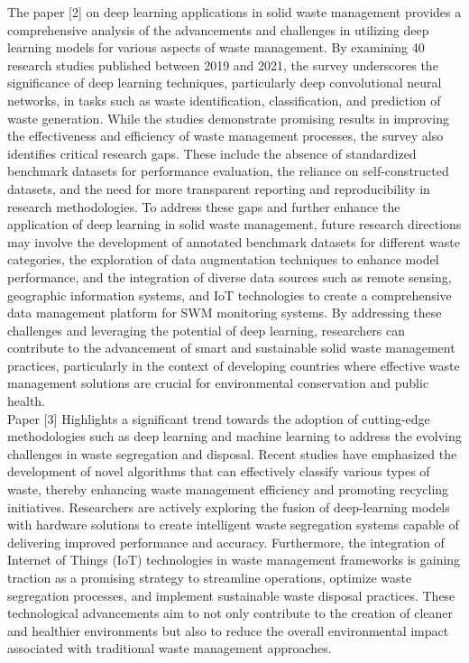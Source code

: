 \documentclass[12pt, English]{article}
\begin{document}
The paper [2] on deep learning applications in solid waste management provides a comprehensive analysis of the advancements and challenges in utilizing deep learning models for various aspects of waste management. By examining 40 research studies published between 2019 and 2021, the survey underscores the significance of deep learning techniques, particularly deep convolutional neural networks, in tasks such as waste identification, classification, and prediction of waste generation. While the studies demonstrate promising results in improving the effectiveness and efficiency of waste management processes, the survey also identifies critical research gaps. These include the absence of standardized benchmark datasets for performance evaluation, the reliance on self-constructed datasets, and the need for more transparent reporting and reproducibility in research methodologies. To address these gaps and further enhance the application of deep learning in solid waste management, future research directions may involve the development of annotated benchmark datasets for different waste categories, the exploration of data augmentation techniques to enhance model performance, and the integration of diverse data sources such as remote sensing, geographic information systems, and IoT technologies to create a comprehensive data management platform for SWM monitoring systems. By addressing these challenges and leveraging the potential of deep learning, researchers can contribute to the advancement of smart and sustainable solid waste management practices, particularly in the context of developing countries where effective waste management solutions are crucial for environmental conservation and public health.\\

Paper [3] Highlights a significant trend towards the adoption of cutting-edge methodologies such as deep learning and machine learning to address the evolving challenges in waste segregation and disposal. Recent studies have emphasized the development of novel algorithms that can effectively classify various types of waste, thereby enhancing waste management efficiency and promoting recycling initiatives. Researchers are actively exploring the fusion of deep-learning models with hardware solutions to create intelligent waste segregation systems capable of delivering improved performance and accuracy. Furthermore, the integration of Internet of Things (IoT) technologies in waste management frameworks is gaining traction as a promising strategy to streamline operations, optimize waste segregation processes, and implement sustainable waste disposal practices. These technological advancements aim to not only contribute to the creation of cleaner and healthier environments but also to reduce the overall environmental impact associated with traditional waste management approaches.\\
\end{document}
